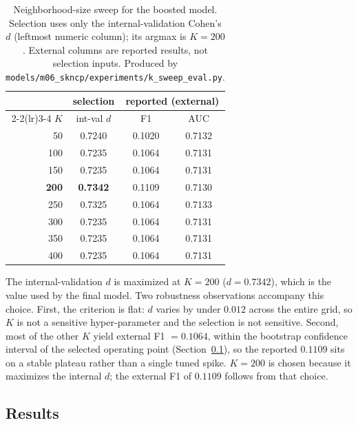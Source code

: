 \documentclass[sigconf, nonacm]{acmart}
\begin{document}
\begin{table}[t]
\centering
\caption{Neighborhood-size sweep for the boosted model. Selection uses only the
internal-validation Cohen's $d$ (leftmost numeric column); its argmax is
$K{=}200$. External columns are reported results, not selection inputs. Produced
by \texttt{models/m06\_skncp/experiments/k\_sweep\_eval.py}.}
\label{tab:kselect}
\small
\begin{tabular}{rccc}
\toprule
 & \multicolumn{1}{c}{\textbf{selection}} & \multicolumn{2}{c}{reported (external)} \\
\cmidrule(lr){2-2}\cmidrule(lr){3-4}
$K$ & int-val $d$ & F1 & AUC \\
\midrule
50  & 0.7240 & 0.1020 & 0.7132 \\
100 & 0.7235 & 0.1064 & 0.7131 \\
150 & 0.7235 & 0.1064 & 0.7131 \\
\textbf{200} & \textbf{0.7342} & 0.1109 & 0.7130 \\
250 & 0.7325 & 0.1064 & 0.7133 \\
300 & 0.7235 & 0.1064 & 0.7131 \\
350 & 0.7235 & 0.1064 & 0.7131 \\
400 & 0.7235 & 0.1064 & 0.7131 \\
\bottomrule
\end{tabular}
\end{table}

The internal-validation $d$ is maximized at $K{=}200$ ($d{=}0.7342$), which is
the value used by the final model. Two robustness observations accompany this
choice. First, the criterion is flat: $d$ varies by under $0.012$ across the
entire grid, so $K$ is not a sensitive hyper-parameter and the selection is not
sensitive. Second, most of the other $K$ yield external F1 ${=}0.1064$, within the
bootstrap confidence interval of the selected operating point
(Section~\ref{sec:task1-results}), so the reported $0.1109$ sits on a stable
plateau rather than a single tuned spike. $K{=}200$ is chosen because it
maximizes the internal $d$; the external F1 of $0.1109$ follows from that choice.

\subsection{Results}
\label{sec:task1-results}
\end{document}
